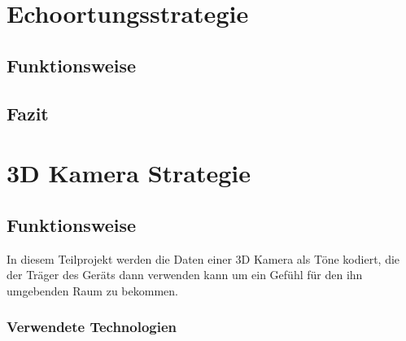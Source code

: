 \documentclass[a4paper,12pt,ngerman]{scrartcl}
\begin{document}
\newpage

\section{Echoortungsstrategie}

\subsection{Funktionsweise}

\subsection{Fazit}

\newpage

\section{3D Kamera Strategie}

\subsection{Funktionsweise}

In diesem Teilprojekt werden die Daten einer 3D Kamera als Töne kodiert, die der Träger des Geräts
dann verwenden kann um ein Gefühl für den ihn umgebenden Raum zu bekommen. 

\subsubsection{Verwendete Technologien}
\end{document}
